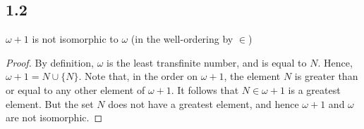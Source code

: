 \subsection*{1.2} $\omega + 1$ is not isomorphic to $\omega$ (in the well-ordering by $\in$)

\begin{proof}
    By definition, $\omega$ is the least transfinite number, and is equal to $N$. Hence, $\omega + 1 = N \cup \{N\}$. Note that, in the order on $\omega + 1$, the element $N$ is greater than or equal to any other element of $\omega+1$. It follows that $N \in \omega + 1$ is a greatest element. But the set $N$ does not have a greatest element, and hence $\omega+1$ and $\omega$ are not isomorphic.
\end{proof}

